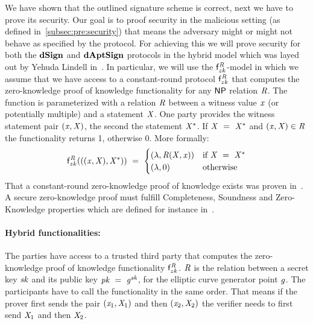 We have shown that the outlined signature scheme is correct, next we have to prove its security.
Our goal is to proof security in the malicious setting (as defined in~\cref{subsec:pre:security}) that means the adversary might or might not behave as specified by the protocol.
For achieving this we will prove security for both the $\mathbf{dSign}$ and $\mathbf{dAptSign}$ protocols in the hybrid model which was layed out by Yehuda Lindell in~\cite{lindell2017simulate}.
In particular, we will use the $\mathsf{f}^{\mathit{R}}_{zk}$-model in which we assume that we have access to a constant-round protocol $\mathsf{f}^{\mathit{R}}_{zk}$ that computes the zero-knowledge proof of knowledge functionality for any $\mathsf{NP}$ relation $\mathit{R}$.
The function is parameterized with a relation $\mathit{R}$ between a witness value $\mathit{x}$ (or potentially multiple)  and a statement $\mathit{X}$.
One party provides the witness statement pair $(\mathit{x}, \mathit{X})$, the second the statement $\mathit{X}^*$.
If $\mathit{X} ~=~ \mathit{X}^*$ and $(\mathit{x}, \mathit{X}) \in \mathit{R}$ the functionality returns 1, otherwise 0.
More formally:
\[
    \mathsf{f}^{\mathit{R}}_{zk}(((\mathit{x}, \mathit{X}), \mathit{X}^*)) ~=~
    \begin{cases}
        (\lambda, \mathit{R}(\mathit{X}, \mathit{x})) & \text{if } \mathit{X} ~=~ \mathit{X}^* \\
        (\lambda, 0) &\text{otherwise}
    \end{cases}
\]
That a constant-round zero-knowledge proof of knowledge exists was proven in~\cite{lindell2013note}.
A secure zero-knowledge proof must fulfill Completeness, Soundness and Zero-Knowledge properties which are defined for instance in~\cite{groth2010short}.

\paragraph{Hybrid functionalities:} The parties have access to a trusted third party that computes the zero-knowledge proof of knowledge functionality $\mathsf{f}^{\mathit{R}}_{zk}$.
$\mathit{R}$ is the relation between a secret key $\mathit{sk}$ and its public key $\mathit{pk} ~=~ \mathit{g}^{\mathit{sk}}$, for the elliptic curve generator point $\mathit{g}$.
The participants have to call the functionality in the same order.
That means if the prover first sends the pair $(\mathit{x}_1, \mathit{X}_1)$ and then $(\mathit{x}_2, \mathit{X}_2)$ the verifier needs to first send $\mathit{X}_1$ and then $\mathit{X}_2$.

